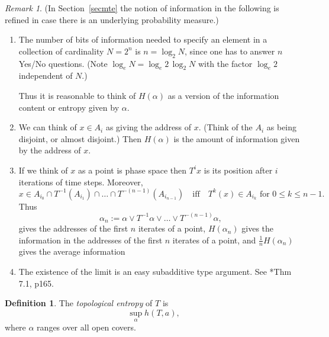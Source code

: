 \documentclass[a4paper]{amsart}
\theoremstyle{plain}
\theoremstyle{definition}
\newtheorem{definition}[theorem]{Definition}%
\theoremstyle{remark}
\newtheorem{remark}[theorem]{Remark}
\begin{document}
\begin{remark} (In Section~\ref{secmte}  the notion of information in the  following is  refined in case there is an underlying probability measure.)

\begin{enumerate}
    
\item The number of bits of information needed to specify an element in a collection of cardinality $ N=2^n $ is $ n = \log_2 N  $, since one has to answer $ n $ Yes/No questions.  (Note $ \log_e N = \log_e 2\, \log_2 N $ with the factor $ \log_e 2 $ independent of $ N $.)

Thus it is reasonable to think of $ H( \alpha   ) $ as a version of the information content or entropy given by $ \alpha  $.  
\item We can think of $ x\in A_i  $ as giving the address of $ x $. (Think of the $  A_i  $ as being disjoint, or almost disjoint.)  Then $ H(\alpha ) $ is the amount of information given by the address of $  x $.

\item  If we think of $ x $ as a point is phase space then $ T^i x $ is its position after $ i $ iterations of time steps. Moreover,  
\[
x \in A_{i_0}\cap T^{-1}(A_{i_1}) \cap \dots \cap T^{-(n-1)}(A_{i_{n-1}})
\quad \text{iff}  \quad  T^k(x) \in A_{i_k}   \text { for } 0\leq k \leq n-1.
\]
Thus   
\[
\alpha_n :=  \alpha \vee T^{-1}\alpha \vee \dots \vee T^{-(n-1)}\alpha,
\]
  gives the addresses of  the first $ n $ iterates of a point, $ H(\alpha_n ) $ gives the information in the addresses of the first $ n $ iterates of a point, and $ \frac{1}{n} H(\alpha_n)$ gives the average information

\item The existence of the limit is an easy subadditive type argument.  See \cite{Wal}*{Thm 7.1, p165}.
\end{enumerate} 

  \end{remark}  
  
  \begin{definition} 
  The \emph{topological  entropy} of $ T $ is
  \[ \sup_\alpha h(T,a), \]
  where $ \alpha $ ranges over all open covers.
  \end{definition}  
 
\end{document}
